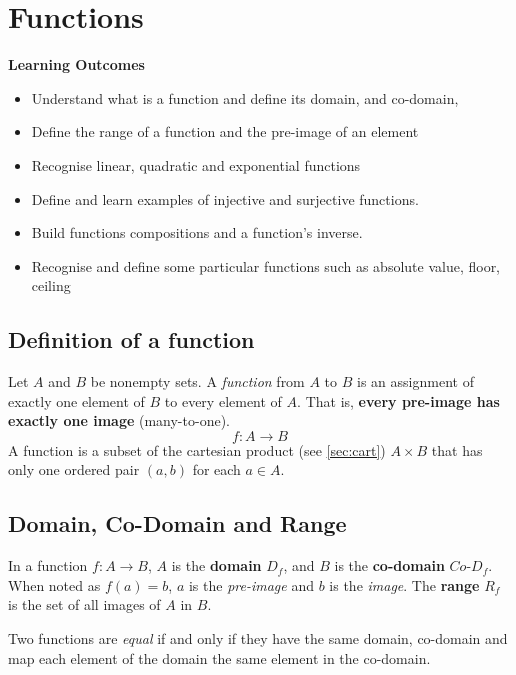 \section{Functions}\label{sec:functions}
\begin{mdframed}
\textbf{Learning Outcomes}
\begin{itemize}[label={\( \checkmark \)}]
\item Understand what is a function and define its domain, and co-domain,
\item Define the range of a function and the pre-image of an element
\item Recognise linear, quadratic and exponential functions
\item Define and learn examples of injective and surjective functions.
\item Build functions compositions and a function’s inverse.
\item Recognise and define some particular functions such as absolute value, floor, ceiling
\end{itemize}
\end{mdframed}
\subsection{Definition of a function}

Let \(A\) and \(B\) be nonempty sets. A \emph{function} from \(A\) to \(B\) is an assignment of exactly one element of \(B\) to every element of \(A\). That is, \textbf{every pre-image has exactly one image} (many-to-one). \[
  f\colon A \rightarrow B
\]
A function is a subset of the cartesian product (see \autoref{sec:cart}) \(A \times B\) that has only one ordered pair \((a,b)\) for each \(a \in A\).

\subsection{Domain, Co-Domain and Range}\label{ssub:domain_co_domain_and_range}
In a function \(f\colon A \rightarrow B\), \(A\) is the \textbf{domain} \(D_f\), and \(B\) is the \textbf{co-domain} \(Co\text{-}D_f\). When noted as \(f(a) = b\), \(a\) is the \emph{pre-image} and \(b\) is the \emph{image}. The \textbf{range} \(R_f\) is the set of all images of \(A\) in \(B\).

Two functions are \emph{equal} if and only if they have the same domain, co-domain and map each element of the domain the same element in the co-domain.

